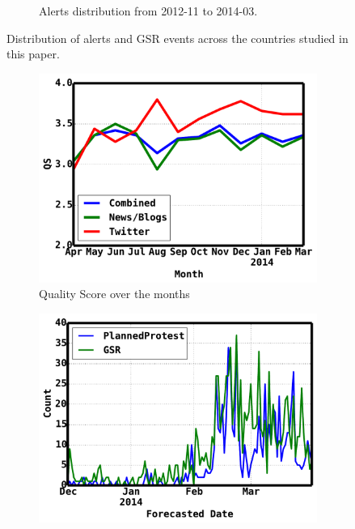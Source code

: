\documentclass[letterpaper]{article}
\begin{document}
\begin{figure}
\begin{subfigure}{\columnwidth}
  \vspace{-2em}
  \caption{Alerts distribution from 2012-11 to 2014-03.}
  \label{fig:ppdistribution}
\end{subfigure}
  \vspace{-.5em}
\caption{Distribution of alerts and GSR events across the countries studied in this paper.}
\label{fig:distribution}
\end{figure}

\begin{figure}
\begin{subfigure}{.70\columnwidth}
    \centering
  \includegraphics[scale=0.2]{monthlyqs}
  \vspace{-0.5em}
  \caption{\scriptsize Quality Score over the months}
  \label{fig:monthlyqs}
\end{subfigure}\hspace{.5pt}
\begin{subfigure}{.70\columnwidth}
    \centering
  \includegraphics[scale=0.2]{venezuela}

\end{subfigure}
\end{figure}
\end{document}
